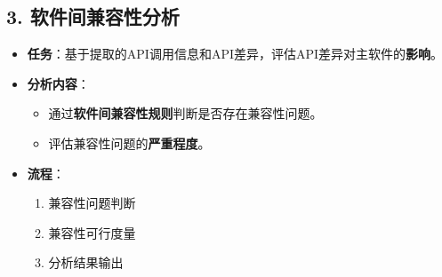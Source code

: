 \documentclass[14pt,a4paper,UTF8,twoside]{article}
\begin{document}
\begin{multicols}{3}
    \columnbreak %

    \subsection*{3. 软件间兼容性分析}
    \begin{itemize}
    \item \textbf{任务}：基于提取的API调用信息和API差异，评估API差异对主软件的\textbf{影响}。
    \item \textbf{分析内容}：
    \begin{itemize}
        \item 通过\textbf{软件间兼容性规则}判断是否存在兼容性问题。
        \item 评估兼容性问题的\textbf{严重程度}。
    \end{itemize}
    \item \textbf{流程}：
    \begin{enumerate}
        \item 兼容性问题判断
        \item 兼容性可行度量
        \item 分析结果输出
    \end{enumerate}
\end{itemize}

\end{multicols} %
\end{document}
